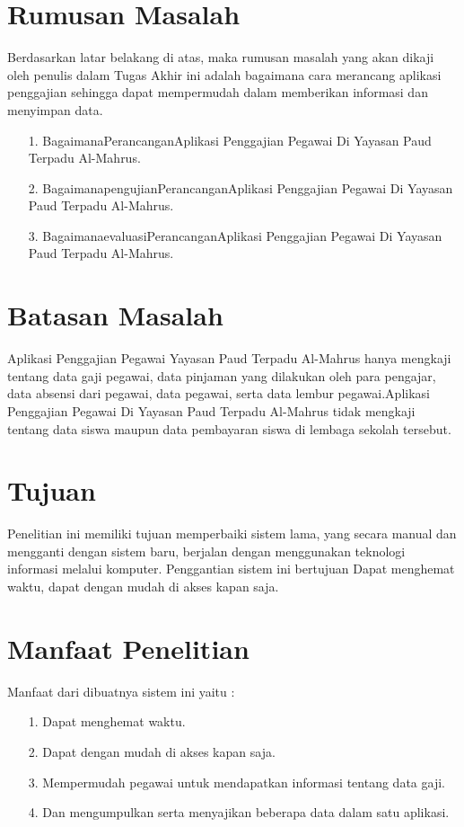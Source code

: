 \documentclass{jtetiproposalskripsi}
\begin{document}
\section{Rumusan Masalah}
Berdasarkan latar belakang di atas, maka rumusan masalah yang akan dikaji oleh penulis dalam Tugas Akhir ini adalah bagaimana cara merancang aplikasi penggajian sehingga dapat mempermudah dalam memberikan informasi dan menyimpan data.
\begin{itemize}
\item[1.]BagaimanaPerancanganAplikasi Penggajian Pegawai Di Yayasan Paud Terpadu Al-Mahrus.
\item[2.]BagaimanapengujianPerancanganAplikasi Penggajian Pegawai Di Yayasan Paud Terpadu Al-Mahrus.
\item[3.]BagaimanaevaluasiPerancanganAplikasi Penggajian Pegawai Di Yayasan Paud Terpadu Al-Mahrus.
\end{itemize}

\section{Batasan Masalah}

Aplikasi Penggajian Pegawai Yayasan Paud Terpadu Al-Mahrus hanya mengkaji tentang data gaji pegawai, data pinjaman yang dilakukan oleh para pengajar, data absensi dari pegawai, data pegawai, serta data lembur pegawai.Aplikasi Penggajian Pegawai Di Yayasan Paud Terpadu Al-Mahrus tidak mengkaji tentang data siswa maupun data pembayaran siswa di lembaga sekolah tersebut.

\section{Tujuan}
Penelitian ini memiliki tujuan memperbaiki sistem lama, yang secara manual dan mengganti dengan sistem baru, berjalan dengan menggunakan teknologi informasi melalui komputer. Penggantian sistem ini bertujuan Dapat menghemat waktu, dapat dengan mudah di akses kapan saja.


\section{Manfaat Penelitian}
Manfaat dari dibuatnya sistem ini yaitu :
\begin{itemize}
\item[1.]Dapat menghemat waktu.
\item[2.]Dapat dengan mudah  di akses kapan saja.
\item[3.]Mempermudah pegawai untuk mendapatkan informasi tentang data gaji.
\item[4.]Dan mengumpulkan serta menyajikan beberapa data dalam satu aplikasi. 
\end{itemize}
\end{document}
